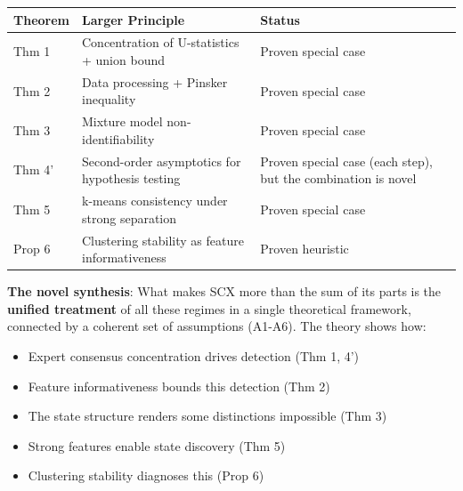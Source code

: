 \documentclass[
  12pt,
]{ctexart}
\providecommand{\tightlist}{%
  \setlength{\itemsep}{0pt}\setlength{\parskip}{0pt}}
\begin{document}
\begin{longtable}[]{@{}
  >{\raggedright\arraybackslash}p{}
  >{\raggedright\arraybackslash}p{}
  >{\raggedright\arraybackslash}p{}@{}}
\toprule\noalign{}
\begin{minipage}[b]{\linewidth}\raggedright
Theorem
\end{minipage} & \begin{minipage}[b]{\linewidth}\raggedright
Larger Principle
\end{minipage} & \begin{minipage}[b]{\linewidth}\raggedright
Status
\end{minipage} \\
\midrule\noalign{}
\endhead
\bottomrule\noalign{}
\endlastfoot
Thm 1 & Concentration of U-statistics + union bound & Proven special
case \\
Thm 2 & Data processing + Pinsker inequality & Proven special case \\
Thm 3 & Mixture model non-identifiability & Proven special case \\
Thm 4' & Second-order asymptotics for hypothesis testing & Proven
special case (each step), but the combination is novel \\
Thm 5 & k-means consistency under strong separation & Proven special
case \\
Prop 6 & Clustering stability as feature informativeness & Proven
heuristic \\
\end{longtable}

\textbf{The novel synthesis}: What makes SCX more than the sum of its
parts is the \textbf{unified treatment} of all these regimes in a single
theoretical framework, connected by a coherent set of assumptions
(A1-A6). The theory shows how:

\begin{itemize}
\tightlist
\item
  Expert consensus concentration drives detection (Thm 1, 4')
\item
  Feature informativeness bounds this detection (Thm 2)
\item
  The state structure renders some distinctions impossible (Thm 3)
\item
  Strong features enable state discovery (Thm 5)
\item
  Clustering stability diagnoses this (Prop 6)
\end{itemize}
\end{document}
